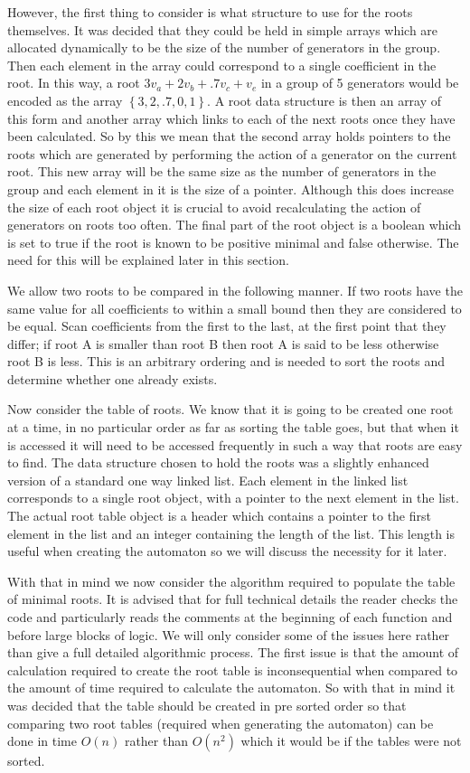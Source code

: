 \documentclass[a4paper,12pt]{article}
\begin{document}
However, the first thing to consider is what structure to use for the roots themselves. It was decided that they could be held in simple arrays which are allocated dynamically to be the size of the number of generators in the group. Then each element in the array could correspond to a single coefficient in the root. In this way, a root $3v_a + 2v_b + .7v_c + v_e$ in a group of 5 generators would be encoded as the array $\left\{3,2,.7,0,1 \right\}$. A root data structure is then an array of this form and another array which links to each of the next roots once they have been calculated. So by this we mean that the second array holds pointers to the roots which are generated by performing the action of a generator on the current root. This new array will be the same size as the number of generators in the group and each element in it is the size of a pointer. Although this does increase the size of each root object it is crucial to avoid recalculating the action of generators on roots too often. The final part of the root object is a boolean which is set to true if the root is known to be positive minimal and false otherwise. The need for this will be explained later in this section.

We allow two roots to be compared in the following manner. If two roots have the same value for all coefficients to within a small bound then they are considered to be equal. Scan coefficients from the first to the last, at the first point that they differ; if root A is smaller than root B then root A is said to be less otherwise root B is less. This is an arbitrary ordering and is needed to sort the roots and determine whether one already exists.

Now consider the table of roots. We know that it is going to be created one root at a time, in no particular order as far as sorting the table goes, but that when it is accessed it will need to be accessed frequently in such a way that roots are easy to find. The data structure chosen to hold the roots was a slightly enhanced version of a standard one way linked list. Each element in the linked list corresponds to a single root object, with a pointer to the next element in the list. The actual root table object is a header which contains a pointer to the first element in the list and an integer containing the length of the list. This length is useful when creating the automaton so we will discuss the necessity for it later.

With that in mind we now consider the algorithm required to populate the table of minimal roots. It is advised that for full technical details the reader checks the code and particularly reads the comments at the beginning of each function and before large blocks of logic. We will only consider some of the issues here rather than give a full detailed algorithmic process. The first issue is that the amount of calculation required to create the root table is inconsequential when compared to the amount of time required to calculate the automaton. So with that in mind it was decided that the table should be created in pre sorted order so that comparing two root tables (required when generating the automaton) can be done in time $O(n)$ rather than $O(n^2)$ which it would be if the tables were not sorted.
\end{document}
